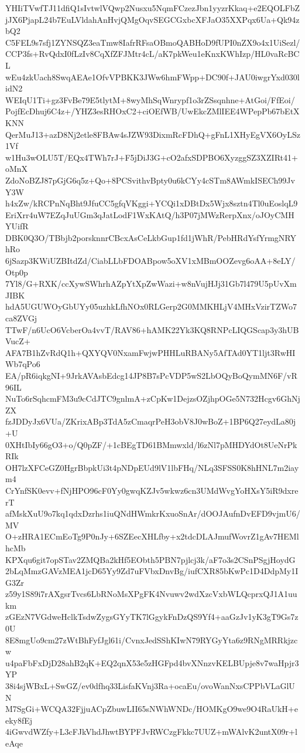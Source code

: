 YHIiTVwfTJ11dfiQ1sIvtwlVQwp2Nusxu5NqmFCzezJbn1yyzrKkaq+e2EQOLFbZ
jJX6PjapL24b7EuLVldahAnHvjQMgOqvSEGCGxbcXFJaO35XXPqx6Ua+Qk94zbQ2
C5FEL9s7sfj1ZYNSQZ3eaTmw8IafrRFsaOBmoQABHoD9fUPI0nZX9o4x1UiSezl/
CCP3fs+RvQdxI0fLzIv8CqXfZFJMtr4cL/aK7pkWeu1eKnxKWhIzp/HL0vaRcBCL
wEu4zkUach8SwqAEAe1OfvVPBKK3JWw6hmFWpp+DC90f+JAU0iwgrYxd030lidN2
WEIqU1Ti+gz3FvBe79E5tlytM+8wyMhSqWnrypf1o3rZSsqnhne+AtGoi/FfEoi/
PojfEcDhuj6C4z+/YHZ3esRHOxC2+ciOEfWB/UwEkcZMlIEE4WPepPb67bEtXKNN
QerMuJ13+azD8Nj2etle8FBAw4sJZW93DixmRcFDhQ+gFnL1XHyEgVX6OyLSz1Vf
w1Hu3wOLU5T/EQx4TWh7rJ+F5jDiJ3G+cO2afxSDPBO6XyzggSZ3XZIRt41+oMnX
ZdoNoBZJ87pGjG6q5z+Qo+8PCSvithvBpty0u6kCYy4cSTm8AWmkISECh99JvY3W
h4xZw/kRCPnNqBht9JfuCC5gfqVKggi+YCQi1xDBtDx5Wjx8sztn4Tl0uEoslqL9
EriXrr4uW7EZqJuUGm3qJatLodF1WxKAtQ/h3P07jMWzRerpXnx/oJOyCMHYUifR
DBK0Q3O/TBbjb2porsknnrCBcxAsCeLkbGup1fd1jWhR/PebHRdYsfYrmgNRYhRo
6jSazp3KWiUZBItdZd/CiabLLbFDOABpow5oXV1xMBmOOZevg6oAA+8eLY/Otp0p
7Yl8/G+RXK/ccXywSWhrhAZpYtXpZwWazi+w8nVujHJj31Gb7l479U5pUvXmJIBK
hdA5UGUWOyGbUYy05uzhkLfhNOx0RLGerp2G0MMKHLjV4MHxVzirTZWo7ca8ZVGj
TTwF/n6UcO6VcberOa4vvT/RAV86+hAMK22Yk3KQ8RNPcLIQGScap3y3hUBVucZ+
AFA7B1hZvRdQ1h+QXYQV0NxamFwjwPHHLuRBANy5AfTAd0YT1ljt3RwHIWb7qPo6
EA/pR6iqkgNI+9JrkAVAsbEdcg14JP8B7sPcVDP5wS2LbOQyBoQymMN6F/vR96IL
NuTo6rSqhcmFM3u9cCdJTC9gnlmA+zCpKw1DejzsOZjhpOGe5N732Hcgv6GhNjZX
fzJDDyJx6VUa/ZKrixABp3TdA5zCmaqrPeH3obV8J0wBoZ+1BP6Q27eydLa80j+U
0XHtIbIy66gO3+o/Q0pZF/+1cBEgTD61BMmwxld/l6zNl7pMHDYdOt8UeNrPkRIk
OH7lzXFCeGZ0HgrBbpkUi3t4pNDpEUd9lV1lbFHq/NLq3SFSS0K8hHNL7m2iaym4
CrYnfSK0evv+fNjHPO96cF0Yy0gwqKZJv5wkwz6cn3UMdWvgYoHXsY5iR9dxrerT
afMskXuU9o7kq1qdxDzrhs1iuQNdHWmkrKxuoSnAr/dOOJAufnDvEFD9vjmU6/MV
O+zHRA1ECmEoTg9P0nJy+6SZEecXHLfby+x2tdcDLAJmufWovrZ1gAv7HEMlhcMb
KPXqu6git7opSTav2ZMQBa2kHf5EObth5PBN7pjlcj3k/aF7o3s2CSnPSgjHoydG
2bLqMmzGAVzMEA1jcD65Yy9Zd7uFVbxDnvBg/iufCXR85bKwPc1D4DdpMy1IG3Zr
z59y1S89i7rAXgsrTvcs6LbRNoMsXPgFK4Nvuwv2wdXzcVxbWLQcprxQJ1A1uukm
zGEzN7VGdweHclkTsdwZygsGYyTK7lGgykFnDzQS9Yf4+aaGzJv1yK3gT9Gs7z0U
8E8mgUo9cm27zWtBhFyfJgl61i/CvnxJedSShKIwN79RYGyYta6z9RNgMRRkjzcw
u4paFbFxDjD28ahB2qK+EQ2qnX53e5zHGFpd4bvXNnzvKELBUpje8v7waHpjr3YP
38i4sjWBxL+SwGZ/ev0dfhq33LisfaKVnj3Ra+ocaEu/ovoWanNxsCPPbVLaGlUN
M7SgGi+WCQA32FjjuACpZbuwLII65sNWhWNDc/HOMKgO9we9O4RaUkH+eeky8fEj
4iGwvdWZfy+L3cFJkVhdJhwtBYPFJvRWCzgFkkc7UUZ+mWAlvK2untX09r+leAqe
